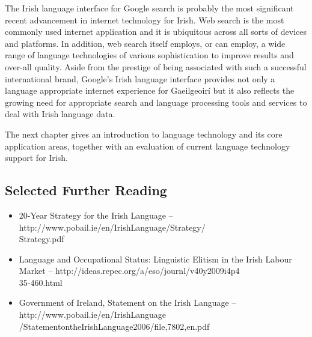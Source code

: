 \documentclass[]{../../metanetpaper}
\begin{document}
\begin{multicols}{2}

The Irish language interface for Google search is probably the most significant recent advancement in internet technology for Irish. Web search is the most commonly used internet application and it is ubiquitous across all sorts of devices and platforms. In addition, web search itself employs, or can employ, a wide range of language technologies of various sophistication to improve results and over-all quality. Aside from the prestige of being associated with such a successful international brand, Google’s Irish language interface provides not only a language appropriate internet experience for Gaeilgeoirí but it also reflects the growing need for appropriate search and language processing tools and services to deal with Irish language data.

The next chapter gives an introduction to language technology and its core application areas, together with an evaluation of current language technology support for Irish.

\subsection{Selected Further Reading}

\begin{itemize}
\item 20-Year Strategy for the Irish Language -- http://www.pobail.ie/en/IrishLanguage/Strategy/\\Strategy.pdf
\item Language and Occupational Status: Linguistic Elitism in the Irish Labour Market -- http://ideas.repec.org/a/eso/journl/v40y2009i4p4\\35-460.html
\item Government of Ireland, Statement on the Irish Language -- http://www.pobail.ie/en/IrishLanguage\\/StatementontheIrishLanguage2006/file,7802,en.pdf
\end{itemize}

\end{multicols}

\clearpage

\end{document}

